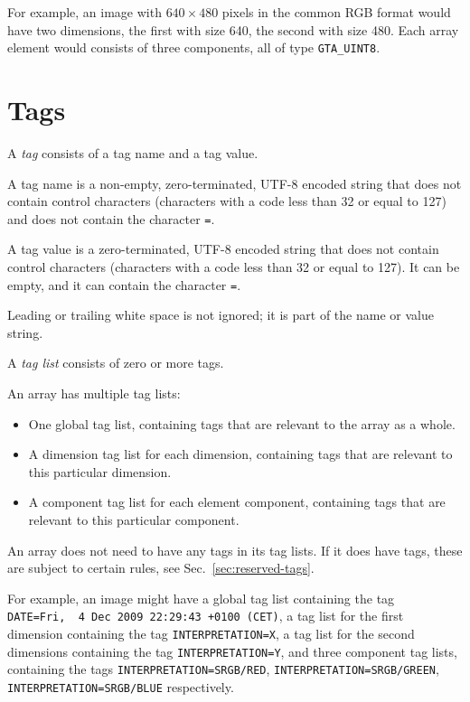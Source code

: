 \documentclass[a4paper,11pt]{article}
\newcommand{\code}[1]{\texttt{#1}}
\begin{document}
For example, an image with $640\times 480$ pixels in the common RGB format
would have two dimensions, the first with size 640, the second with size 480.
Each array element would consists of three components, all of type
\code{GTA\_UINT8}.

\section{Tags}
\label{sec:tags}

A \emph{tag} consists of a tag name and a tag value.

A tag name is a non-empty, zero-terminated, \mbox{UTF-8} encoded string that does not
contain control characters (characters with a code less than 32 or equal to 127)
and does not contain the character \code{=}.

A tag value is a zero-terminated, \mbox{UTF-8} encoded string that does not contain
control characters (characters with a code less than 32 or equal to 127). It can
be empty, and it can contain the character \code{=}.

Leading or trailing white space is not ignored; it is part of the name or
value string.

A \emph{tag list} consists of zero or more tags.

An array has multiple tag lists:
\begin{itemize}
\item One global tag list, containing tags that are relevant to the array as a
whole.
\item A dimension tag list for each dimension, containing tags that are
relevant to this particular dimension.
\item A component tag list for each element component, containing tags that
are relevant to this particular component.
\end{itemize}

An array does not need to have any tags in its tag lists. If it does have
tags, these are subject to certain rules, see Sec.~\ref{sec:reserved-tags}.

For example, an image might have a global tag list containing the tag
\code{DATE=Fri,~~4 Dec 2009 22:29:43 +0100 (CET)}, 
a tag list for the first dimension containing the tag \code{INTERPRETATION=X},
a tag list for the second dimensions containing the tag
\code{INTERPRETATION=Y}, and three component tag lists, containing the tags
\code{INTERPRETATION=SRGB/RED}, \code{INTERPRETATION=SRGB/GREEN},
\code{INTERPRETATION=SRGB/BLUE} respectively.
\end{document}
